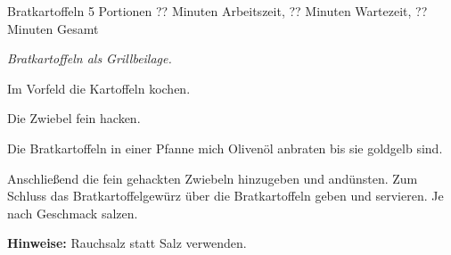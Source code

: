 \begin{recipe}{Bratkartoffeln} {5 Portionen} {?? Minuten Arbeitszeit, ?? Minuten Wartezeit, ?? Minuten Gesamt}

  \freeform
  \textit{Bratkartoffeln als Grillbeilage.}


  Im Vorfeld die Kartoffeln kochen.

  \newstep
  Die Zwiebel fein hacken.

  \newstep
  Die Bratkartoffeln in einer Pfanne mich Olivenöl anbraten bis sie goldgelb sind.

  \newstep
  Anschließend die fein gehackten Zwiebeln hinzugeben und andünsten.
  Zum Schluss das Bratkartoffelgewürz über die Bratkartoffeln geben und servieren.
  Je nach Geschmack salzen.

  \freeform
  \hrulefill

  \freeform
  \textbf{Hinweise:}
  Rauchsalz statt Salz verwenden.

\end{recipe}
